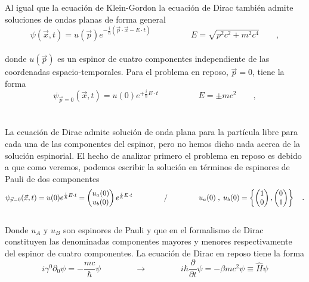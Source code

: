 \documentclass[11pt,letterpaper]{article}     %
\begin{document}
Al igual que la ecuación de Klein-Gordon la ecuación de Dirac también admite soluciones de ondas planas de forma general
\begin{equation} \label{eq:44}
\psi(\vec{x},t)=u(\vec{p})e^{-\frac{i}{\hbar}(\vec{p} \cdot \vec{x} - E \cdot t)}  \hspace{2cm} E=\sqrt{p^2c^2 + m^2c^4} \qquad ,
\end{equation} \\ 
donde $u(\vec{p})$ es un espinor de cuatro componentes independiente de las coordenadas espacio-temporales. Para el problema en reposo, $\vec{p}=0$, tiene la forma\\
\begin{equation} \label{eq:45}
\psi_{\vec{p}=0}(\vec{x},t)=u(0)e^{+\frac{i}{\hbar} E \cdot t}  \hspace{2cm} E= \pm mc^2 \qquad ,
\end{equation} \\
\\La ecuación de Dirac admite solución de onda plana para la partícula libre para cada una de las componentes del espinor, pero no hemos dicho nada acerca de la solución espinorial. El hecho de analizar primero el problema en reposo es debido a que como veremos, podemos escribir la solución en términos de espinores de Pauli de dos componentes \\
\begin{equation} \label{eq:46}
\psi_{\vec{p}=0}(\vec{x},t) = u(0) e^{\frac{i}{\hbar}E \cdot t} =
\begin{pmatrix}
u_a(0) \\ u_b (0)
\end{pmatrix} e^{\frac{i}{\hbar}E \cdot t}
\hspace{1.5cm} / \hspace{1.5cm}
u_a(0) \; ,\; u_b(0)=\left\lbrace
\begin{pmatrix}
1 \\ 0
\end{pmatrix},
\begin{pmatrix}
0 \\ 1
\end{pmatrix} 
\right\rbrace \quad .
\end{equation}\\
Donde $u_A$ y $u_B$ son espinores de Pauli y que en el formalismo de Dirac constituyen las denominadas componentes mayores y menores respectivamente del espinor de cuatro componentes. La ecuación de Dirac en reposo tiene la forma
\begin{equation} \label{eq:47}
i \gamma^0 \partial_0 \psi = -\frac{mc}{\hbar} \psi \qquad \qquad \rightarrow \qquad \qquad i \hbar \frac{\partial}{\partial t} \psi = - \beta mc^2 \psi \equiv \hat{H}\psi
\end{equation} \\
\end{document}
